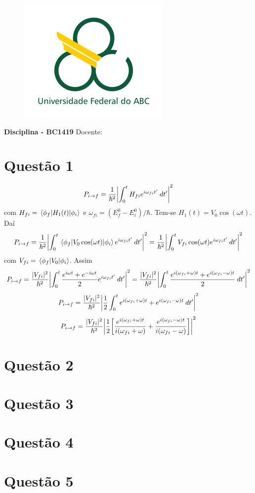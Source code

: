 \documentclass[report,12pt,openright,oneside,a4paper,brazil]{abntex2}
\date{Data}
\renewcommand{\imprimircapa}{%
\begin{capa}%
	\begin{figure}[ht]
		\centering
		\includegraphics[scale=0.6]{logo.jpg}
		\label{fig:logo}
	\end{figure}
	\begin{center}
		\textbf{\large Disciplina - BC1419}
		\vfill
    	{\LARGE\textbf{\imprimirtitulo}}
    	\vfill
    	Docente: \imprimirorientador
    	\vspace*{1cm}
		\imprimirautor
		\vfill
    	\imprimirlocal \\
    	\imprimirdata
	\end{center}
\end{capa}
}
\begin{document}
\imprimircapa


\chapter{Questão 1}

\begin{equation}
    P_{i \rightarrow f} = \frac{1}{\hbar^2}\qty|\int_0^t H_{fi} e^{i\omega_{fi}t'}\:dt'|^2
\end{equation}
com $H_{fi}=\mel{\phi_f}{H_1(t)}{\phi_i}$ e $\omega_{fi}=(E^0_f-E^0_i)/\hbar$. Tem-se $H_1(t)=V_0 \cos(\omega t)$. Daí
$$P_{i \rightarrow f} = \frac{1}{\hbar^2}\qty|\int_0^t \mel{\phi_f}{V_0 \cos(\omega t)}{\phi_i} e^{i\omega_{fi}t'}\:dt'|^2= \frac{1}{\hbar^2}\qty|\int_0^t V_{fi} \cos(\omega t) e^{i\omega_{fi}t'}\:dt'|^2$$
com $V_{fi}=\mel{\phi_f}{V_0}{\phi_i}$. Assim
$$P_{i \rightarrow f} = \frac{|V_{fi}|^2}{\hbar^2}\qty|\int_0^t \frac{e^{i\omega t}+e^{-i\omega t}}{2} e^{i\omega_{fi}t'}\:dt'|^2 = \frac{|V_{fi}|^2}{\hbar^2}\qty|\int_0^t \frac{e^{i(\omega_{fi}+\omega) t}+e^{i(\omega_{fi}-\omega )t}}{2}\:dt'|^2$$
$$P_{i \rightarrow f} = \frac{|V_{fi}|^2}{\hbar^2}\qty|\frac{1}{2}\int_0^t e^{i(\omega_{fi}+\omega) t}+e^{i(\omega_{fi}-\omega )t}\:dt'|^2$$
$$P_{i \rightarrow f} = \frac{|V_{fi}|^2}{\hbar^2}\qty|\frac{1}{2} \qty[\frac{e^{i(\omega_{fi}+\omega) t}}{i(\omega_{fi}+\omega)}+\frac{e^{i(\omega_{fi}-\omega )t}}{i(\omega_{fi}-\omega )}]|^2$$



\chapter{Questão 2}

\chapter{Questão 3}

\chapter{Questão 4}

\chapter{Questão 5}
\end{document}

